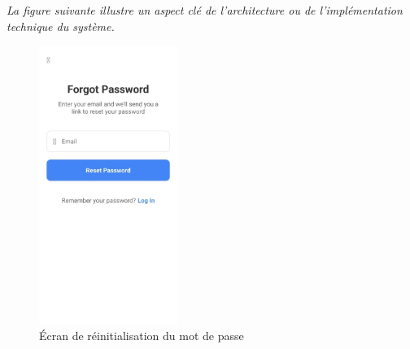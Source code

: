\noindent
\textit{La figure suivante illustre un aspect clé de l'architecture ou de l'implémentation technique du système.}
\begin{figure}[H]
    \centering
    \includegraphics[width=0.4\textwidth]{assets/docs/mobile/forget-password-page.jpeg}
    \caption{Écran de réinitialisation du mot de passe}
    \label{fig:mobile-forgot-password}
\end{figure}

